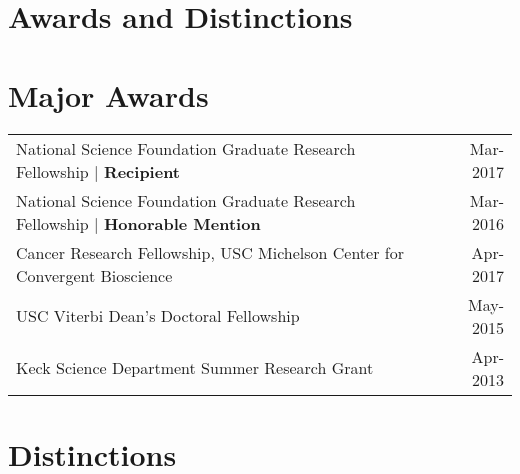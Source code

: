 \documentclass[10pt,a4paper]{article}
\begin{document}
  \vspace*{2mm}\section*{\textbf{Awards and Distinctions}}

  \vspace*{2mm}\section*{Major Awards}
  \vspace*{1mm}\noindent\begin{tabularx}{17cm}{X r}
    National Science Foundation Graduate Research Fellowship | \textbf{Recipient} & Mar-2017 \\
    National Science Foundation Graduate Research Fellowship | \textbf{Honorable Mention} & Mar-2016 \\
    Cancer Research Fellowship, USC Michelson Center for Convergent Bioscience & Apr-2017 \\ %
    USC Viterbi Dean's Doctoral Fellowship & May-2015 \\
    Keck Science Department Summer Research Grant & Apr-2013 %
  \end{tabularx}

  \vspace*{2mm}\section*{Distinctions}
  
\end{document}
